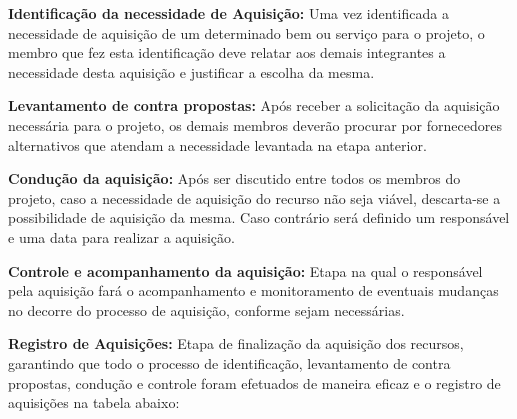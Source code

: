 \textbf{Identificação da necessidade de Aquisição:} Uma vez identificada a necessidade
de aquisição de um determinado bem ou serviço para o projeto, o membro que fez esta
identificação deve relatar aos demais integrantes a necessidade desta aquisição e
justificar a escolha da mesma.

\textbf{Levantamento de contra propostas:} Após receber a solicitação da aquisição
necessária para o projeto, os demais membros deverão procurar por fornecedores alternativos
que atendam a necessidade levantada na etapa anterior.

\textbf{Condução da aquisição:} Após ser discutido entre todos os membros do projeto,
  caso a necessidade de aquisição do recurso não seja viável, descarta-se a possibilidade
  de aquisição da mesma. Caso contrário será definido um responsável e uma data para realizar a aquisição.

\textbf{Controle e acompanhamento da aquisição:} Etapa na qual o responsável pela
aquisição fará o acompanhamento e monitoramento de eventuais mudanças no decorre
do processo de aquisição, conforme sejam necessárias.

\textbf{Registro de Aquisições:} Etapa de finalização da aquisição dos recursos,
garantindo que todo o processo de identificação, levantamento de contra propostas,
condução e controle foram efetuados de maneira eficaz e o registro de
aquisições na tabela abaixo:


